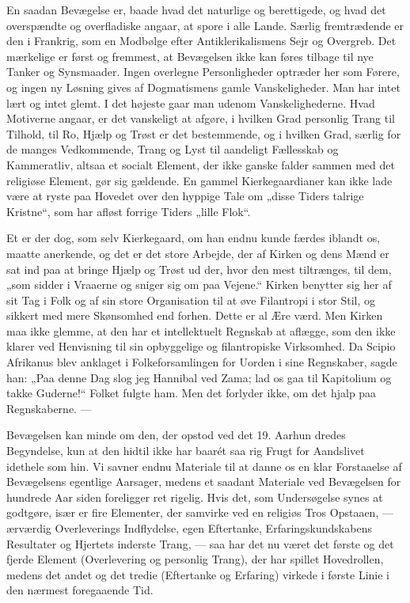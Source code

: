 \documentclass[12pt,a4paper,openany]{book}
\newcommand{\opage}[1]{\marginnote{\footnotesize\textit{[#1]}}}
\begin{document}
En saadan Bevægelse er, baade hvad det naturlige og berettigede,
og hvad det overspændte og overfladiske angaar, at spore i alle
Lande. Særlig fremtrædende er den i Frankrig, som en Modbølge
efter Antiklerikalismens Sejr og Overgreb. Det mærkelige er først og
fremmest, at Bevægelsen ikke kan føres tilbage til nye Tanker og
Synsmaader. Ingen overlegne Personligheder optræder her som
Førere, og ingen ny Løsning gives af Dogmatismens gamle Vanskeligheder.
Man har intet lært og intet glemt. I det højeste gaar man
udenom Vanskelighederne. Hvad Motiverne angaar, er det vanskeligt
at afgøre, i hvilken Grad personlig Trang til Tilhold, til Ro, Hjælp
og Trøst er det bestemmende, og i hvilken Grad, særlig for de manges
Vedkommende, Trang og Lyst til aandeligt Fællesskab og Kammeratliv,
altsaa et socialt Element, der ikke ganske falder sammen
med det religiøse Element, gør sig gældende. En gammel Kierkegaardianer
kan ikke lade være at ryste paa Hovedet over den hyppige
Tale om „disse Tiders talrige Kristne“, som har afløst forrige
Tiders „lille Flok“.

Et er der dog, som selv Kierkegaard, om han endnu kunde færdes
iblandt os, maatte anerkende, og det er det store Arbejde, der
af Kirken og dens Mænd er sat ind paa at bringe Hjælp og Trøst
ud der, hvor den mest tiltrænges, til dem, „som sidder i Vraaerne
og sniger sig om paa Vejene.“ Kirken benytter sig her af sit Tag i
Folk og af sin store Organisation til at øve Filantropi i stor Stil,
og sikkert med mere Skønsomhed end forhen. Dette er al Ære værd.
Men Kirken maa ikke glemme, at den har et intellektuelt Regnskab
at aflægge, som den ikke klarer ved Henvisning til sin opbyggelige
og filantropiske Virksomhed. Da Scipio Afrikanus blev anklaget i
Folkeforsamlingen for Uorden i sine Regnskaber, sagde han: „Paa
denne Dag slog jeg Hannibal ved Zama; lad os gaa til Kapitolium og
takke Guderne!“ Folket fulgte ham. Men det forlyder ikke, om det
hjalp paa Regnskaberne. ---

Bevægelsen kan minde om den, der opstod ved det 19. Aarhun%
\opage{149}dredes Begyndelse, kun at den hidtil ikke har baarét saa rig Frugt
for Aandslivet idethele som hin. Vi savner endnu Materiale til at
danne os en klar Forstaaelse af Bevægelsens egentlige Aarsager, medens
et saadant Materiale ved Bevægelsen for hundrede Aar siden
foreligger ret rigelig. Hvis det, som Undersøgelse synes at godtgøre,
især er fire Elementer, der samvirke ved en religiøs Tros Opstaaen,
--- ærværdig Overleverings Indflydelse, egen Eftertanke, Erfaringskundskabens
Resultater og Hjertets inderste Trang, --- saa har det
nu været det første og det fjerde Element (Overlevering og personlig
Trang), der har spillet Hovedrollen, medens det andet og det tredie
(Eftertanke og Erfaring) virkede i første Linie i den nærmest foregaaende
Tid.
\end{document}
